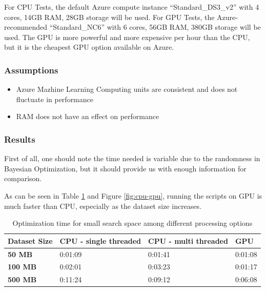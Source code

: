 \documentclass[12pt,twoside]{report}
\begin{document}
For CPU Tests, the default Azure compute instance “Standard\_DS3\_v2” with 4 cores, 14GB RAM, 28GB storage will be used. For GPU Tests, the Azure-recommended “Standard\_NC6” with 6 cores, 56GB RAM, 380GB storage will be used. The GPU is more powerful and more expensive per hour than the CPU, but it is the cheapest GPU option available on Azure.

\subsubsection{Assumptions}
\begin{itemize}
  \item Azure Mazhine Learning Computing units are consistent and does not fluctuate in performance 
  \item RAM does not have an effect on performance
\end{itemize}

\subsubsection{Results}

First of all, one should note the time needed is variable due to the randomness in Bayesian Optimization, but it should provide us with enough information for comparison.

As can be seen in Table \ref{tab:cpu-gpu} and Figure \ref{fig:cpu-gpu}, running the scripts on GPU is much faster than CPU, especially as the dataset size increases.

\begin{table}[h]
\centering
\begin{tabular}{|l|l|l|l|}
\hline
\textbf{Dataset Size} & \textbf{CPU - single threaded} & \textbf{CPU - multi threaded} & \textbf{GPU} \\ \hline
\textbf{50 MB}  & 0:01:09 & 0:01:41 & 0:01:08 \\ \hline
\textbf{100 MB} & 0:02:01 & 0:03:23 & 0:01:17 \\ \hline
\textbf{500 MB} & 0:11:24 & 0:09:12 & 0:06:08 \\ \hline
\end{tabular}
\caption{Optimization time for small search space among different processing options}
\label{tab:cpu-gpu}
\end{table}
\end{document}
